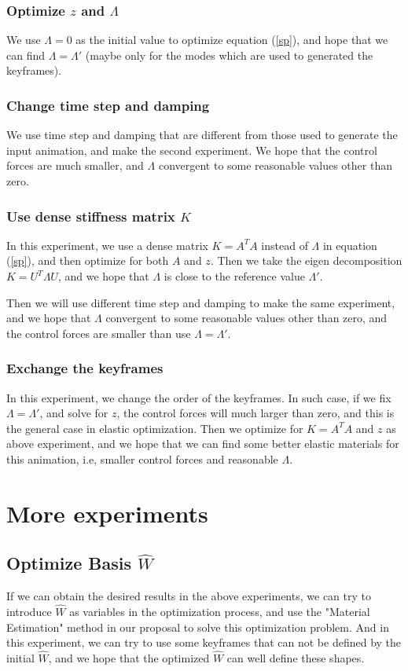 \documentclass[9pt,twocolumn]{extarticle}
\begin{document}
\subsubsection{Optimize $z$ and $\Lambda$}
We use $\Lambda=0$ as the initial value to optimize equation (\ref{sp}), and
hope that we can find $\Lambda=\Lambda'$ (maybe only for the modes which are
used to generated the keyframes).

\subsubsection{Change time step and damping}
We use time step and damping that are different from those used to generate the
input animation, and make the second experiment. We hope that the control forces
are much smaller, and $\Lambda$ convergent to some reasonable values other
than zero.

\subsubsection{Use dense stiffness matrix $K$}
In this experiment, we use a dense matrix $K=A^TA$ instead of $\Lambda$ in
equation (\ref{sp}), and then optimize for both $A$ and $z$. Then we take the
eigen decomposition $K = U^T\Lambda U$, and we hope that $\Lambda$ is close to
the reference value $\Lambda'$.

Then we will use different time step and damping to make the same experiment,
and we hope that $\Lambda$ convergent to some reasonable values other than zero,
and the control forces are smaller than use $\Lambda=\Lambda'$.

\subsubsection{Exchange the keyframes}
In this experiment, we change the order of the keyframes. In such case, if we
fix $\Lambda = \Lambda'$, and solve for $z$, the control forces will much larger
than zero, and this is the general case in elastic optimization. Then we
optimize for $K=A^TA$ and $z$ as above experiment, and we hope that we can find
some better elastic materials for this animation, i.e, smaller control forces
and reasonable $\Lambda$.

\section{More experiments}
\subsection{Optimize Basis $\hat{W}$}
If we can obtain the desired results in the above experiments, we can try to
introduce $\hat{W}$ as variables in the optimization process, and use the
"Material Estimation" method in our proposal to solve this optimization
problem. And in this experiment, we can try to use some keyframes that can not
be defined by the initial $\hat{W}$, and we hope that the optimized $\hat{W}$
can well define these shapes.
\end{document}
